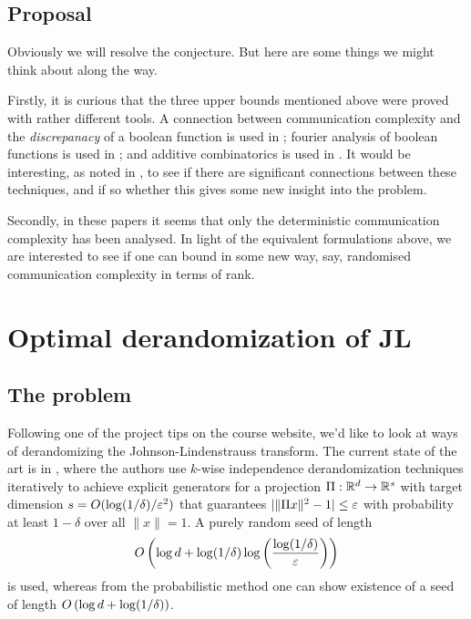 \subsection{Proposal}

Obviously we will resolve the conjecture. But here are some things we
might think about along the way.

Firstly, it is curious that the three upper bounds mentioned above
were proved with rather different tools. A connection between
communication complexity and the \textit{discrepanacy} of a boolean
function is used in \cite{lovett-2013}; fourier analysis of boolean
functions is used in \cite{tsang-2013}; and additive combinatorics is
used in \cite{ben-sasson-2012}. It would be interesting, as noted in
\cite{lovett-2013}, to see if there are significant connections
between these techniques, and if so whether this gives some new
insight into the problem.

Secondly, in these papers it seems that only the deterministic
communication complexity has been analysed. In light of the equivalent
formulations above, we are interested to see if one can bound in some
new way, say, randomised communication complexity in terms of rank.


\section{Optimal derandomization of JL}

\subsection{The problem}

Following one of the project tips on the course website, we'd like to
look at ways of derandomizing the Johnson-Lindenstrauss transform. The
current state of the art is in \cite{kane2011almost}, where the
authors use $k$-wise independence derandomization techniques
iteratively to achieve explicit generators for a projection
$\Pi:\mathbb{R}^d\to\mathbb{R}^s$ with target dimension $s=O(\log(1/\delta)/\varepsilon^2)$
that guarantees $|\|\Pi x\|^2-1|\leq\varepsilon$ with probability at least
$1-\delta$ over all $\|x\|=1$. A purely random seed of length
\[
O \left(\log d + \log(1/\delta)\log \left(\frac{\log(1/\delta)}{\varepsilon}\right)\right)
\]
is used, whereas from the probabilistic method one can show existence
of a seed of length $O \left(\log d + \log(1/\delta)\right)$.

